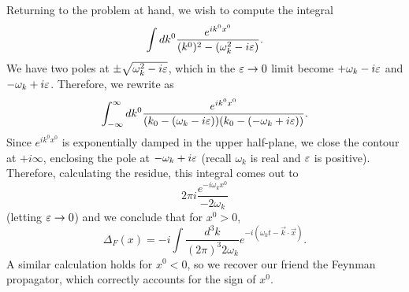 Returning to the problem at hand, we wish to compute the integral
$$\int dk^0 \frac{e^{i k^0 x^0}}{(k^0)^2-(\omega_k^2-i\varepsilon)}.$$ We have two poles at $\pm\sqrt{\omega_k^2-i\varepsilon}$, which in the $\varepsilon\to 0$ limit become $+\omega_k-i\varepsilon$ and $-\omega_k+i\varepsilon$. Therefore, we rewrite as
$$\int_{-\infty}^\infty dk^0 \frac{e^{i k^0 x^0}}{(k_0-(\omega_k-i\varepsilon))(k_0-(-\omega_k+i\varepsilon))}.$$
Since $e^{ik^0x^0}$ is exponentially damped in the upper half-plane, we close the contour at $+i\infty$, enclosing the pole at $-\omega_k+i\varepsilon$ (recall $\omega_k$ is real and $\varepsilon$ is positive). Therefore, calculating the residue, this integral comes out to
$$2\pi i \frac{e^{-i\omega_k x^0}}{-2\omega_k}$$
(letting $\varepsilon\to 0$) and we conclude that for $x^0>0$,
$$\Delta_F(x)=-i \int \frac{d^3 k}{(2\pi)^3 2\omega_k}e^{-i(\omega_k t- \vec{k}\cdot \vec{x})}.$$
A similar calculation holds for $x^0 < 0$, so we recover our friend the Feynman propagator, which correctly accounts for the sign of $x^0$.